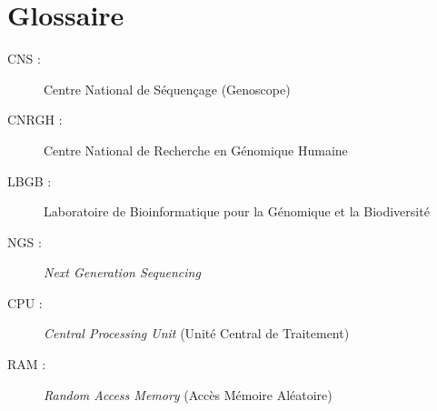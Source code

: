 \section{Glossaire}

\begin{description}
    \item[CNS :] Centre National de Séquençage (Genoscope)
    \item[CNRGH :] Centre National de Recherche en Génomique Humaine 
    \item[LBGB :] Laboratoire de Bioinformatique pour la Génomique et la Biodiversité
    \item[NGS :] \emph{Next Generation Sequencing}
    \item[CPU :] \emph{Central Processing Unit} (Unité Central de Traitement)
    \item[RAM :] \emph{Random Access Memory} (Accès Mémoire Aléatoire)
\end{description}